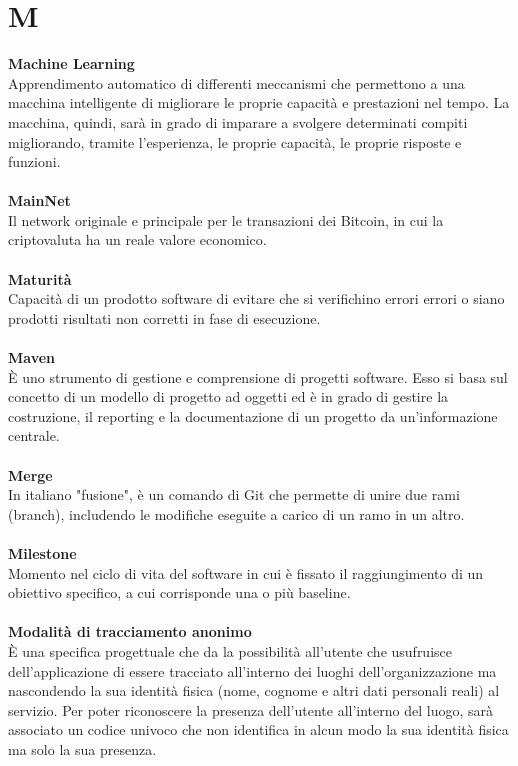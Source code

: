 \section{M}
\textbf{Machine Learning}\\
Apprendimento automatico di differenti meccanismi che permettono a una macchina intelligente di migliorare le proprie capacità e prestazioni nel tempo. La macchina, quindi, sarà in grado di imparare a svolgere determinati compiti migliorando, tramite l’esperienza, le proprie capacità, le proprie risposte e funzioni. \\ \\
\textbf{MainNet}\\
Il network originale e principale per le transazioni dei Bitcoin, in cui la criptovaluta ha un reale valore economico. \\ \\
\textbf{Maturità}\\
Capacità di un prodotto software di evitare che si verifichino errori errori o siano prodotti risultati non corretti in fase di esecuzione. \\ \\
\textbf{Maven}\\
È uno strumento di gestione e comprensione di progetti software. Esso si basa sul concetto di un modello di progetto ad oggetti ed è in grado di gestire la costruzione, 
il reporting e la documentazione di un progetto da un'informazione centrale. \\ \\
\textbf{Merge}\\
In italiano "fusione", è un comando di Git che permette di unire due rami (branch), includendo le modifiche eseguite a carico di un ramo in un altro. \\ \\
\textbf{Milestone}\\
Momento nel ciclo di vita del software in cui è fissato il raggiungimento di un obiettivo specifico, a cui corrisponde una o più baseline.\\ \\
\textbf{Modalità di tracciamento anonimo}\\
È una specifica progettuale che da la possibilità all’utente che usufruisce dell’applicazione di essere tracciato all'interno dei luoghi dell'organizzazione ma nascondendo la sua identità fisica (nome, cognome e altri dati personali reali) al servizio. Per poter riconoscere la presenza dell'utente all'interno del luogo, sarà associato un codice univoco che non identifica in alcun modo la sua identità fisica ma solo la sua presenza.\\ \\
